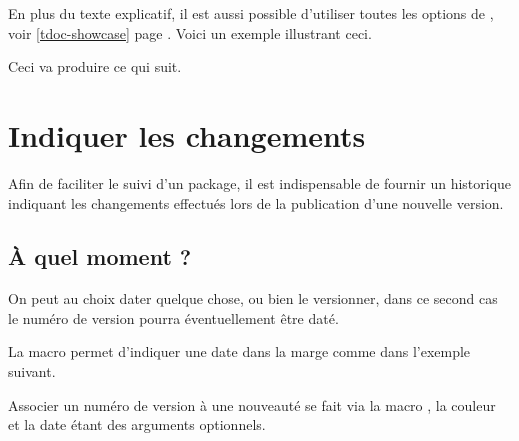 

\begin{tdocexa}
    En plus du texte explicatif, il est aussi possible d'utiliser toutes les options de , voir \ref{tdoc-showcase} page \pageref{tdoc-showcase}.
    Voici un exemple illustrant ceci.

    \medskip



    \medskip

    Ceci va produire ce qui suit.

    \medskip

    \begin{tdoc-doc-showcase}
        

    \end{tdoc-doc-showcase}
\end{tdocexa}


\section{Indiquer les changements}

Afin de faciliter le suivi d'un package, il est indispensable de fournir un historique indiquant les changements effectués lors de la publication d'une nouvelle version.



\subsection{À quel moment ?}

On peut au choix dater quelque chose, ou bien le versionner, dans ce second cas le numéro de version pourra éventuellement être daté.




\begin{tdocexa}
    La macro  permet d'indiquer une date dans la marge comme dans l'exemple suivant.


\end{tdocexa}




\begin{tdocexa}
    Associer un numéro de version à une nouveauté se fait via la macro , la couleur et la date étant des arguments optionnels.


\end{tdocexa}


